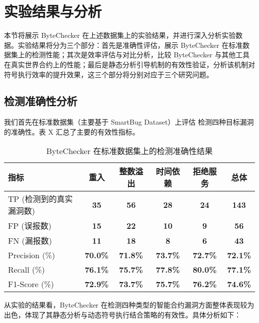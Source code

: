\documentclass[print, master, vlined, timesmath]{DissertUESTC}
\begin{document}
\section{实验结果与分析}

本节将展示 ByteChecker 在上述数据集上的实验结果，并进行深入分析实验数据。实验结果将分为三个部分：首先是准确性评估，展示 ByteChecker 在标准数据集上的检测性能；其次是效率评估与对比分析，比较 ByteChecker 与其他工具在真实世界合约上的性能；最后是静态分析引导机制的有效性验证，分析该机制对符号执行效率的提升效果，这三个部分将分别对应于三个研究问题。

\subsection{检测准确性分析}

我们首先在标准数据集（主要基于 SmartBug Dataset）上评估  检测四种目标漏洞的准确性。表 X 汇总了主要的有效性指标。

\begin{table}[H]
    \centering
    \caption{ByteChecker 在标准数据集上的检测准确性结果}
    \label{tab:accuracy_results_ch5}
    \begin{tabular}{lccccc}
    \toprule
    指标 & 重入 & 整数溢出 & 时间依赖 & 拒绝服务 & \textbf{总体} \\ 
    \midrule
    TP (检测到的真实漏洞数) & \textbf{35} & \textbf{56} & \textbf{28} & \textbf{24} & \textbf{143} \\ 
    FP (误报数) & \textbf{15} & \textbf{22} & \textbf{10} & \textbf{9} & \textbf{56} \\ 
    FN (漏报数) & \textbf{11} & \textbf{18} & \textbf{8} & \textbf{6} & \textbf{43} \\ 
    \midrule
    Precision (\%) & \textbf{70.0\%} & \textbf{71.8\%} & \textbf{73.7\%} & \textbf{72.7\%} & \textbf{72.1\%} \\ 
    Recall  (\%) & \textbf{76.1\%} & \textbf{75.7\%} & \textbf{77.8\%} & \textbf{80.0\%} & \textbf{77.1\%} \\ 
    F1-Score (\%) & \textbf{72.9\%} & \textbf{73.7\%} & \textbf{75.7\%} & \textbf{76.2\%} & \textbf{74.6\%} \\ 
    \bottomrule
    \end{tabular}
\end{table}

    
从实验的结果看，ByteChecker 在检测四种类型的智能合约漏洞方面整体表现较为出色，体现了其静态分析与动态符号执行结合策略的有效性。具体分析如下：
\end{document}
